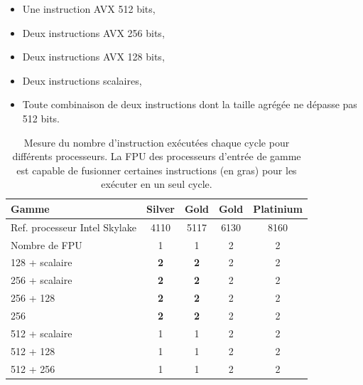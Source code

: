         \begin{itemize}
            \item Une instruction AVX 512 bits,
            \item Deux instructions AVX 256 bits,
            \item Deux instructions AVX 128 bits,
            \item Deux instructions scalaires,
            \item Toute combinaison de deux instructions dont la taille agrégée ne dépasse pas 512 bits.
        \end{itemize}
        
        
        \begin{table}[h!]
        \normalsize
        \centering
        \begin{tabular}{|l|c|c|c|c|}
            \hline
            \rowcolor[HTML]{EFEFEF} 
            Gamme & Silver & Gold & Gold & Platinium \\ \hline
            \rowcolor[HTML]{EFEFEF} 
            Ref. processeur Intel Skylake & 4110 & 5117 & 6130 & 8160 \\ \hline
            \rowcolor[HTML]{EFEFEF} 
            Nombre de FPU & 1 & 1 & 2 & 2 \\ \hline
            128 + scalaire & \textbf{2} & \textbf{2} & 2 & 2 \\ \hline
            256 + scalaire & \textbf{2} & \textbf{2} & 2 & 2 \\ \hline
            256 + 128 & \textbf{2} & \textbf{2} & 2 & 2 \\ \hline
            256 & \textbf{2} & \textbf{2} & 2 & 2 \\ \hline
            512 + scalaire & 1 & 1 & 2 & 2 \\ \hline
            512 + 128 & 1 & 1 & 2 & 2 \\ \hline
            512 + 256 & 1 & 1 & 2 & 2 \\ \hline
        
        \end{tabular}
        \caption{Mesure du nombre d'instruction exécutées chaque cycle pour différents processeurs. La FPU des processeurs d'entrée de gamme est capable de fusionner certaines instructions (en gras) pour les exécuter en un seul cycle.}
        \label{res:skl}
        \end{table}
        
